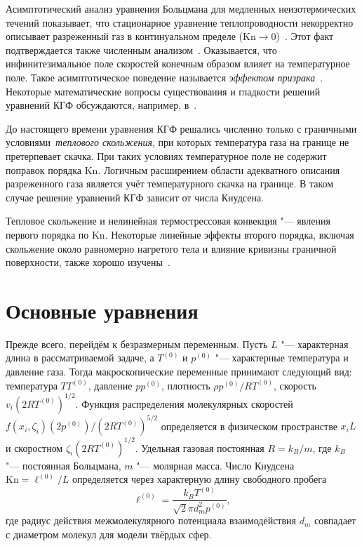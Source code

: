 \documentclass[
aps,%
12pt,%
final,%
notitlepage,%
oneside,%
onecolumn,%
nobibnotes,%
nofootinbib,%
superscriptaddress,%
noshowpacs,%
showkeys,%
centertags]%
{revtex4}
\newcommand{\Kn}{\mathrm{Kn}}
\begin{document}
Асимптотический анализ уравнения Больцмана для медленных неизотермических течений
показывает, что стационарное уравнение теплопроводности некорректно описывает
разреженный газ в континуальном пределе (\(\Kn\to0\))~\cite{Bobylev1995}.
Этот факт подтверждается также численным анализом~\cite{Sone1996}.
Оказывается, что инфинитезимальное поле скоростей конечным образом влияет на температурное поле.
Такое асимптотическое поведение называется \emph{эффектом призрака}~\cite{Sone2002, Sone2007}.
Некоторые математические вопросы существования и гладкости решений уравнений КГФ обсуждаются,
например, в~\cite{Tan2016}.

До настоящего времени уравнения КГФ решались численно только
с граничными условиями~\emph{теплового скольжения},
при которых температура газа на границе не претерпевает скачка.
При таких условиях температурное поле не содержит поправок порядка \(\Kn\).
Логичным расширением области адекватного описания разреженного газа является
учёт температурного скачка на границе. В таком случае решение уравнений КГФ
зависит от числа Кнудсена.

Тепловое скольжение и нелинейная термострессовая конвекция "--- явления первого порядка по \(\Kn\).
Некоторые линейные эффекты второго порядка, включая скольжение около равномерно нагретого тела
и влияние кривизны граничной поверхности, также хорошо изучены~\cite{Sone2002, Sone2007, Takata2015curvature}.

\section{Основные уравнения}

Прежде всего, перейдём к безразмерным переменным.
Пусть \(L\) "--- характерная длина в рассматриваемой задаче,
а \(T^{(0)}\) и \(p^{(0)}\) "--- характерные температура и давление газа.
Тогда макроскопические переменные принимают следующий вид:
температура \(TT^{(0)}\), давление \(pp^{(0)}\),
плотность \(\rho p^{(0)}/RT^{(0)}\), скорость \(v_i(2RT^{(0)})^{1/2}\).
Функция распределения молекулярных скоростей \(f(x_i,\zeta_i)(2p^{(0)})/(2RT^{(0)})^{5/2}\)
определяется в физическом пространстве \(x_iL\) и скоростном \(\zeta_i(2RT^{(0)})^{1/2}\).
Удельная газовая постоянная \(R = k_B/m\), где \(k_B\) "--- постоянная Больцмана,
\(m\) "--- молярная масса.
Число Кнудсена \(\Kn = \ell^{(0)}/L\) определяется через характерную длину свободного пробега
\begin{equation}\label{eq:ell}
    \ell^{(0)} = \frac{k_B T^{(0)}}{\sqrt2\pi d_m^2 p^{(0)}},
\end{equation}
где радиус действия межмолекулярного потенциала взаимодействия \(d_m\)
совпадает с диаметром молекул для модели твёрдых сфер.
\end{document}
